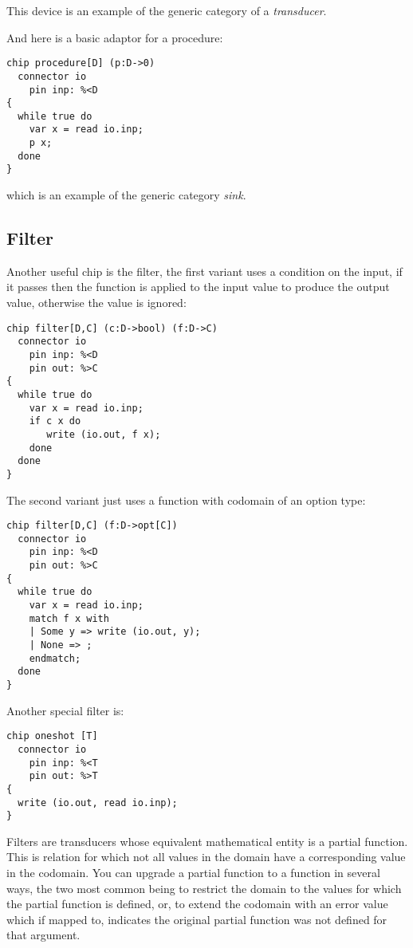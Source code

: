 \documentclass[oneside]{book}
\begin{document}
This device is an example of the generic category 
of a {\em transducer}.  

And here is a basic adaptor for a procedure:

\begin{verbatim}
chip procedure[D] (p:D->0)
  connector io
    pin inp: %<D
{
  while true do 
    var x = read io.inp;
    p x;
  done
}
\end{verbatim}

which is an example of the generic category {\em sink}.

\subsection{Filter}
Another useful chip is the filter, the first variant
uses a condition on the input, if it passes then the
function is applied to the input value to produce
the output value, otherwise the value is ignored:

\begin{verbatim}
chip filter[D,C] (c:D->bool) (f:D->C)
  connector io
    pin inp: %<D
    pin out: %>C
{
  while true do
    var x = read io.inp;
    if c x do
       write (io.out, f x);
    done
  done
}
\end{verbatim}

The second variant just uses a function with codomain
of an option type:

\begin{verbatim}
chip filter[D,C] (f:D->opt[C])
  connector io
    pin inp: %<D
    pin out: %>C
{
  while true do
    var x = read io.inp;
    match f x with
    | Some y => write (io.out, y);
    | None => ;
    endmatch;
  done
}
\end{verbatim}

Another special filter is:

\begin{verbatim}
chip oneshot [T]
  connector io
    pin inp: %<T
    pin out: %>T
{
  write (io.out, read io.inp);
}
\end{verbatim}

Filters are transducers whose equivalent mathematical entity is
a partial function. This is relation for which not all values in
the domain have a corresponding value in the codomain.
You can upgrade a partial function to a function in several ways,
the two most common being to restrict the domain to the values for which
the partial function is defined, or, to extend the codomain with an
error value which if mapped to, indicates the original partial
function was not defined for that argument.
\end{document}
